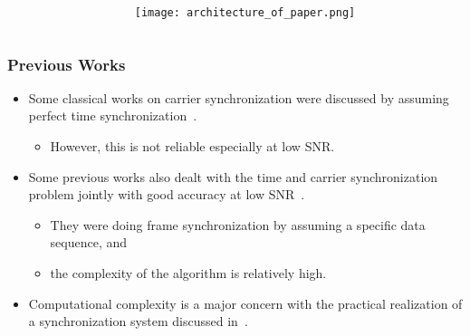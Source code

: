 \begin{frame}
\begin{columns}
\begin{column}{0.54\textwidth}
      \end{column} 

    \begin{column}{0.46\textwidth} 

        \begin{center}
          \texttt{[image: architecture\_of\_paper.png]}
        \end{center}
      
      \end{column}
    \end{columns}

\end{frame}

\begin{frame}
  \frametitle{Previous Works}
  \begin{itemize}
      \item Some classical works on carrier synchronization were discussed by assuming perfect time synchronization~\cite{Morelli_Mengali_98}.
      \begin{itemize}
        \item  However, this is not reliable especially at low SNR.
      \end{itemize}
      \item Some previous works also dealt with the time and carrier synchronization problem jointly with good accuracy at low SNR~\cite{purushothaman_16,kim_17}. 
      \begin{itemize}
        \item They were doing frame synchronization by assuming a specific data sequence, and 
        \item the complexity of the algorithm is relatively high.
      \end{itemize}
      \item Computational complexity is a major concern with the practical realization of a synchronization system discussed in~\cite{murin_16,wang_21}.
  
  \end{itemize}
\end{frame}